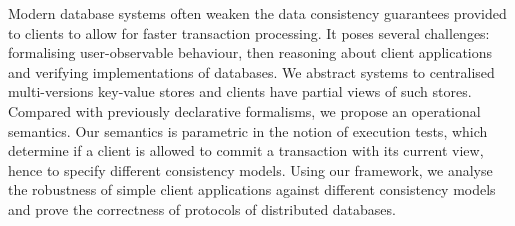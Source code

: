 Modern database systems often weaken the data consistency guarantees 
provided to clients to allow for faster transaction processing. 
It poses several challenges: formalising user-observable behaviour,
then reasoning about client applications 
and verifying implementations of databases.
We abstract systems to centralised multi-versions key-value stores and 
clients have partial views of such stores.
Compared with previously declarative formalisms,
we propose an operational semantics. 
Our semantics is parametric in the notion of execution tests, 
which determine if a client is allowed to commit a transaction with its current view,
hence to specify different consistency models. 
Using our framework, 
we analyse the robustness of simple client applications 
against different consistency models and prove the correctness 
of protocols of distributed databases.
